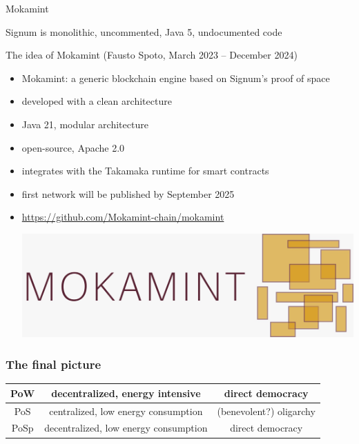 \documentclass[11pt]{beamer}  %
\begin{document}
\begin{frame}{Mokamint}

  Signum is monolithic, uncommented, Java 5, undocumented code

  \bigskip

  \begin{greenbox}{The idea of Mokamint (Fausto Spoto, March 2023 -- December 2024)}
    \begin{itemize}
    \item Mokamint: a generic blockchain engine based on Signum's proof of space
    \item developed with a clean architecture
    \item Java 21, modular architecture
    \item open-source, Apache 2.0
    \item integrates with the Takamaka runtime for smart contracts
    \item first network will be published by September 2025
    \item \url{https://github.com/Mokamint-chain/mokamint}
      \begin{center}
        \includegraphics[scale=0.08,clip=false]{pictures/mokamint_colors.jpg}
      \end{center}
    \end{itemize}
  \end{greenbox}

\end{frame}

\begin{frame}\frametitle{The final picture}

  \begin{center}
    \begin{tabular}{c||c|c}
      PoW & decentralized, energy intensive & direct democracy \\\hline
      PoS & centralized, low energy consumption & (benevolent?) oligarchy \\\hline
      PoSp & decentralized, low energy consumption & direct democracy
    \end{tabular}
  \end{center}
  
\end{frame}
\end{document}
